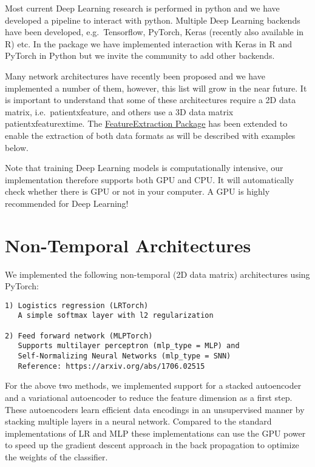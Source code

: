 \documentclass[
]{article}
\begin{document}
Most current Deep Learning research is performed in python and we have
developed a pipeline to interact with python. Multiple Deep Learning
backends have been developed, e.g.~Tensorflow, PyTorch, Keras (recently
also available in R) etc. In the package we have implemented interaction
with Keras in R and PyTorch in Python but we invite the community to add
other backends.

Many network architectures have recently been proposed and we have
implemented a number of them, however, this list will grow in the near
future. It is important to understand that some of these architectures
require a 2D data matrix,
i.e.~\textbar patient\textbar x\textbar feature\textbar, and others use
a 3D data matrix
\textbar patient\textbar x\textbar feature\textbar x\textbar time\textbar.
The \href{www.github.com/ohdsi/FeatureExtraction}{FeatureExtraction
Package} has been extended to enable the extraction of both data formats
as will be described with examples below.

Note that training Deep Learning models is computationally intensive,
our implementation therefore supports both GPU and CPU. It will
automatically check whether there is GPU or not in your computer. A GPU
is highly recommended for Deep Learning!

\hypertarget{non-temporal-architectures}{%
\section{Non-Temporal Architectures}\label{non-temporal-architectures}}

We implemented the following non-temporal (2D data matrix) architectures
using PyTorch:

\begin{verbatim}
1) Logistics regression (LRTorch)
   A simple softmax layer with l2 regularization

2) Feed forward network (MLPTorch) 
   Supports multilayer perceptron (mlp_type = MLP) and 
   Self-Normalizing Neural Networks (mlp_type = SNN)
   Reference: https://arxiv.org/abs/1706.02515
\end{verbatim}

For the above two methods, we implemented support for a stacked
autoencoder and a variational autoencoder to reduce the feature
dimension as a first step. These autoencoders learn efficient data
encodings in an unsupervised manner by stacking multiple layers in a
neural network. Compared to the standard implementations of LR and MLP
these implementations can use the GPU power to speed up the gradient
descent approach in the back propagation to optimize the weights of the
classifier.
\end{document}
